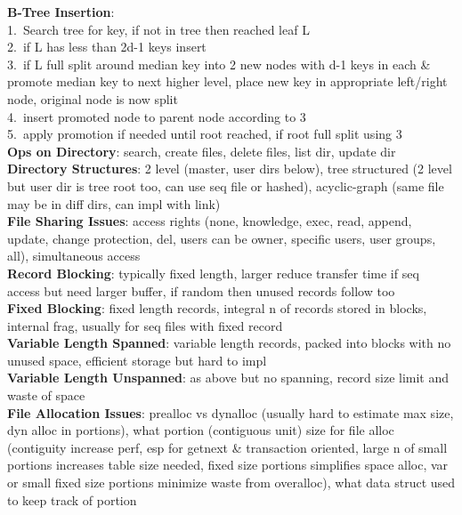 \documentclass[a4paper]{article}
\begin{document}
\begin{multicols}{2}
        \textbf{B-Tree Insertion}:\\
        1.\ Search tree for key, if not in tree then reached leaf L\\
        2.\ if L has less than 2d-1 keys insert\\
        3.\ if L full split around median key into 2 new nodes with d-1 keys in each \& promote median key to next higher level, place new key in appropriate left/right node, original node is now split\\
        4.\ insert promoted node to parent node according to 3\\
        5.\ apply promotion if needed until root reached, if root full split using 3\\
        \textbf{Ops on Directory}: search, create files, delete files, list dir, update dir\\
        \textbf{Directory Structures}: 2 level (master, user dirs below), tree structured (2 level but user dir is tree root too, can use seq file or hashed), acyclic-graph (same file may be in diff dirs, can impl with link)\\
        \textbf{File Sharing Issues}: access rights (none, knowledge, exec, read, append, update, change protection, del, users can be owner, specific users, user groups, all), simultaneous access\\
        \textbf{Record Blocking}: typically fixed length, larger reduce transfer time if seq access but need larger buffer, if random then unused records follow too\\
        \textbf{Fixed Blocking}: fixed length records, integral n of records stored in blocks, internal frag, usually for seq files with fixed record\\
        \textbf{Variable Length Spanned}: variable length records, packed into blocks with no unused space, efficient storage but hard to impl\\
        \textbf{Variable Length Unspanned}: as above but no spanning, record size limit and waste of space\\
        \textbf{File Allocation Issues}: prealloc vs dynalloc (usually hard to estimate max size, dyn alloc in portions), what portion (contiguous unit) size for file alloc (contiguity increase perf, esp for getnext \& transaction oriented, large n of small portions increases table size needed, fixed size portions simplifies space alloc, var or small fixed size portions minimize waste from overalloc), what data struct used to keep track of portion\\

\end{multicols}
\end{document}
